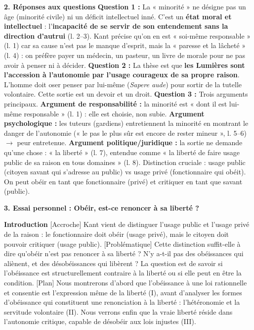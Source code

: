 \documentclass[11pt]{article}
\begin{document}
\begin{exoresolu}
\textbf{2. Réponses aux questions}
\textbf{Question 1 :} La « minorité » ne désigne pas un âge (minorité civile) ni un déficit intellectuel inné. C'est un \textbf{état moral et intellectuel} : l'\textbf{incapacité de se servir de son entendement sans la direction d'autrui} (l. 2--3). Kant précise qu'on en est « soi-même responsable » (l. 1) car sa cause n'est pas le manque d'esprit, mais la « paresse et la lâcheté » (l. 4) : on préfère payer un médecin, un pasteur, un livre de morale pour ne pas avoir à penser ni à décider.
\textbf{Question 2 :} La thèse est que \textbf{les Lumières sont l'accession à l'autonomie par l'usage courageux de sa propre raison}. L'homme doit oser penser par lui-même (\emph{Sapere aude}) pour sortir de la tutelle volontaire. Cette sortie est un devoir et un droit.
\textbf{Question 3 :} Trois arguments principaux. \textbf{Argument de responsabilité :} la minorité est « dont il est lui-même responsable » (l. 1) : elle est choisie, non subie. \textbf{Argument psychologique :} les tuteurs (gardiens) entretiennent la minorité en montrant le danger de l'autonomie (« le pas le plus sûr est encore de rester mineur », l. 5--6) $\rightarrow$ peur entretenue. \textbf{Argument politique/juridique :} la sortie ne demande qu'une chose : « la liberté » (l. 7), entendue comme « la liberté de faire usage public de sa raison en tous domaines » (l. 8). Distinction cruciale : usage public (citoyen savant qui s'adresse au public) vs usage privé (fonctionnaire qui obéit). On peut obéir en tant que fonctionnaire (privé) et critiquer en tant que savant (public).

\textbf{3. Essai personnel : Obéir, est-ce renoncer à sa liberté ?}

\textbf{Introduction}
[Accroche] Kant vient de distinguer l'usage public et l'usage privé de la raison : le fonctionnaire doit obéir (usage privé), mais le citoyen doit pouvoir critiquer (usage public). [Problématique] Cette distinction suffit-elle à dire qu'obéir n'est pas renoncer à sa liberté ? N'y a-t-il pas des obéissances qui aliènent, et des désobéissances qui libèrent ? La question est de savoir si l'obéissance est structurellement contraire à la liberté ou si elle peut en être la condition. [Plan] Nous montrerons d'abord que l'obéissance à une loi rationnelle et consentie est l'expression même de la liberté (I), avant d'analyser les formes d'obéissance qui constituent une renonciation à la liberté : l'hétéronomie et la servitude volontaire (II). Nous verrons enfin que la vraie liberté réside dans l'autonomie critique, capable de désobéir aux lois injustes (III).


\end{exoresolu}
\end{document}
